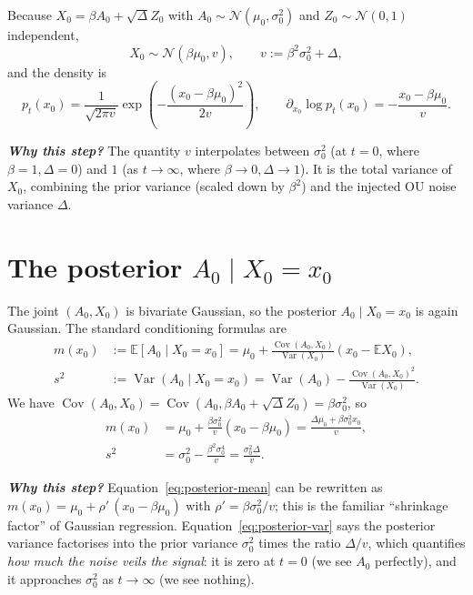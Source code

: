 \documentclass[11pt,a4paper,openany]{book}
\theoremstyle{plainserif}
\theoremstyle{definition}
\theoremstyle{remarkstyle}
\newenvironment{whybox}{%
  \begin{center}\begin{minipage}{0.95\linewidth}\small
  \textbf{\textit{Why this step?}}\quad\ignorespaces}{%
  \end{minipage}\end{center}}
\newcommand{\E}{\mathbb{E}}
\newcommand{\V}{\operatorname{Var}}
\newcommand{\Cov}{\operatorname{Cov}}
\newcommand{\Normal}{\mathcal{N}}
\begin{document}
Because $X_0 = \beta A_0 + \sqrt{\Delta}Z_0$ with
$A_0 \sim \Normal(\mu_0, \sigma_0^2)$ and $Z_0 \sim \Normal(0,1)$
independent,
\begin{equation}
X_0 \sim \Normal(\beta\mu_0, v), \qquad
v := \beta^2 \sigma_0^2 + \Delta,
\label{eq:x0-marginal}
\end{equation}
and the density is
\begin{equation}
p_t(x_0) = \frac{1}{\sqrt{2\pi v}}\exp\!\left(-\frac{(x_0-\beta\mu_0)^2}{2v}\right),
\qquad
\partial_{x_0}\log p_t(x_0) = -\frac{x_0 - \beta\mu_0}{v}.
\label{eq:x0-score}
\end{equation}

\begin{whybox}
The quantity $v$ interpolates between $\sigma_0^2$ (at $t=0$, where
$\beta=1,\Delta=0$) and $1$ (as $t\to\infty$, where $\beta\to 0,\Delta\to 1$).
It is the total variance of $X_0$, combining the prior variance
(scaled down by $\beta^2$) and the injected OU noise variance $\Delta$.
\end{whybox}

\section{The posterior $A_0 \mid X_0 = x_0$}

The joint $(A_0, X_0)$ is bivariate Gaussian, so the posterior
$A_0 \mid X_0 = x_0$ is again Gaussian. The standard conditioning
formulas are
\begin{align}
m(x_0) &:= \E[A_0 \mid X_0 = x_0]
  = \mu_0 + \frac{\Cov(A_0, X_0)}{\V(X_0)}(x_0 - \E X_0), \\
s^2 &:= \V(A_0 \mid X_0 = x_0)
  = \V(A_0) - \frac{\Cov(A_0, X_0)^2}{\V(X_0)}.
\end{align}
We have
$\Cov(A_0, X_0) = \Cov(A_0, \beta A_0 + \sqrt{\Delta}Z_0) = \beta\sigma_0^2$,
so
\begin{align}
m(x_0) &= \mu_0 + \frac{\beta \sigma_0^2}{v}(x_0 - \beta\mu_0)
       = \frac{\Delta \mu_0 + \beta\sigma_0^2 x_0}{v},
\label{eq:posterior-mean}\\
s^2 &= \sigma_0^2 - \frac{\beta^2 \sigma_0^4}{v} = \frac{\sigma_0^2 \Delta}{v}.
\label{eq:posterior-var}
\end{align}

\begin{whybox}
Equation~\eqref{eq:posterior-mean} can be rewritten as
$m(x_0) = \mu_0 + \rho'\, (x_0 - \beta\mu_0)$
with $\rho' = \beta\sigma_0^2/v$; this is the familiar
``shrinkage factor'' of Gaussian regression.
Equation~\eqref{eq:posterior-var} says the posterior variance
factorises into the prior variance $\sigma_0^2$ times the ratio
$\Delta/v$, which quantifies \emph{how much the noise veils the signal}:
it is zero at $t=0$ (we see $A_0$ perfectly), and it approaches
$\sigma_0^2$ as $t \to \infty$ (we see nothing).
\end{whybox}
\end{document}
